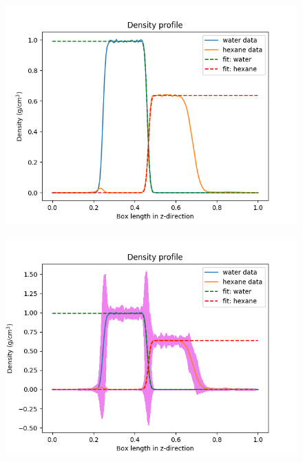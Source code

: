 \documentclass[12pt,reqno]{amsart}
\numberwithin{equation}{section}
\begin{document}
\begin{enumerate}
\begin{figure}[H]
\centering
\includegraphics[scale=0.6]{interface_density_profile_simultaneousfit_NVTequil-16bead-long-noSE}
\end{figure}

\begin{figure}[H]
\centering
\includegraphics[scale=0.6]{interface_density_profile_simultaneousfit_NVTequil-16bead-long}
\end{figure}


\end{enumerate}
\end{document}
